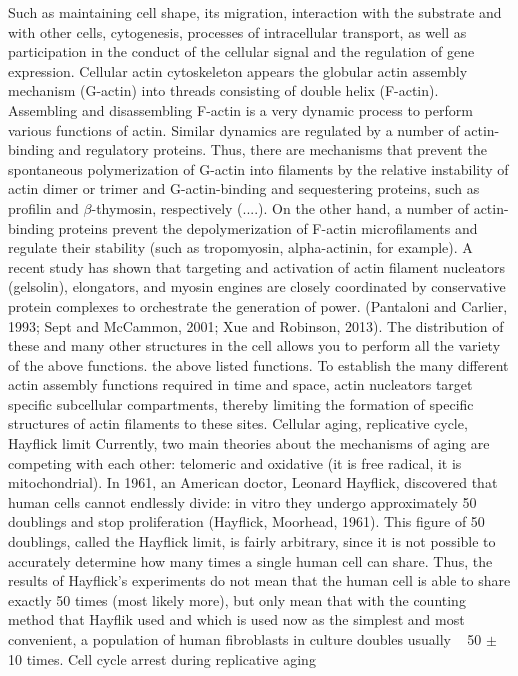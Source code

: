 \documentclass[english,authoryear]{elsarticle}
\begin{document}
Such as maintaining cell shape, its migration, interaction with the substrate and with other cells, cytogenesis, processes of intracellular transport, as well as participation in the conduct of the cellular signal and the regulation of gene expression.
Cellular actin cytoskeleton appears
the globular actin assembly mechanism (G-actin) into threads consisting of double helix (F-actin).
Assembling and disassembling F-actin is a very dynamic process to perform various functions of actin. Similar dynamics are regulated by a number of actin-binding and regulatory proteins.
Thus, there are mechanisms that prevent the spontaneous polymerization of G-actin into filaments by the relative instability of actin dimer or trimer and G-actin-binding and sequestering proteins, such as profilin and $\beta$-thymosin, respectively (....).
On the other hand, a number of actin-binding proteins prevent the depolymerization of F-actin microfilaments and regulate their stability (such as tropomyosin, alpha-actinin, for example). A recent study has shown that targeting and activation of actin filament nucleators (gelsolin), elongators, and myosin engines are closely coordinated by conservative protein complexes to orchestrate the generation of power. (Pantaloni and Carlier, 1993; Sept and McCammon, 2001; Xue and Robinson, 2013). The distribution of these and many other structures in the cell allows you to perform all the variety of the above functions.
the above listed functions.
To establish the many different actin assembly functions required in time and space, actin nucleators target specific subcellular compartments, thereby limiting the formation of specific structures of actin filaments to these sites.
Cellular aging, replicative cycle, Hayflick limit
Currently, two main theories about the mechanisms of aging are competing with each other: telomeric and oxidative (it is free radical, it is mitochondrial). In 1961, an American doctor, Leonard Hayflick, discovered that human cells cannot endlessly divide: in vitro they undergo approximately 50 doublings and stop proliferation (Hayflick, Moorhead, 1961). This figure of 50 doublings, called the Hayflick limit, is fairly arbitrary, since it is not possible to accurately determine how many times a single human cell can share. Thus, the results of Hayflick's experiments do not mean that the human cell is able to share exactly 50 times (most likely more), but only mean that with the counting method that Hayflik used and which is used now as the simplest and most convenient, a population of human fibroblasts in culture doubles usually ~ 50 $\pm$ 10 times.
Cell cycle arrest during replicative aging
\end{document}
